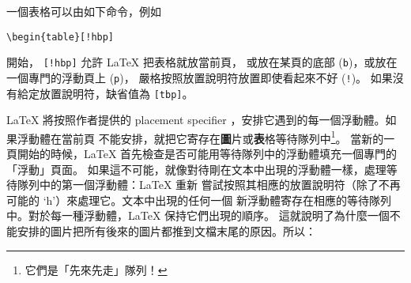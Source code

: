 一個表格可以由如下命令，例如
\begin{code}
\verb|\begin{table}[!hbp]|
\end{code}
\noindent 開始， \verb|[!hbp]| 允許 \LaTeX{} 把表格就放當前頁，
或放在某頁的底部 (\texttt{b})，或放在一個專門的浮動頁上 (\texttt{p})，
嚴格按照放置說明符放置即使看起來不好 (\texttt{!})。
如果沒有給定放置說明符，缺省值為 \verb|[tbp]|。

\LaTeX{} 將按照作者提供的 placement
specifier ，安排它遇到的每一個浮動體。如果浮動體在當前頁
不能安排，就把它寄存在{\textbf 圖片}或{\textbf
表格}等待隊列中\footnote{它們是「先來先走」隊列！}。
當新的一頁開始的時候，\LaTeX{} 首先檢查是否可能用等待隊列中的浮動體填充一個專門的「浮動」頁面。
如果這不可能，就像對待剛在文本中出現的浮動體一樣，處理等待隊列中的第一個浮動體：\LaTeX{} 重新
嘗試按照其相應的放置說明符（除了不再可能的 `h'）來處理它。文本中出現的任何一個
新浮動體寄存在相應的等待隊列中。對於每一種浮動體，\LaTeX{} 保持它們出現的順序。
這就說明了為什麼一個不能安排的圖片把所有後來的圖片都推到文檔末尾的原因。所以：

